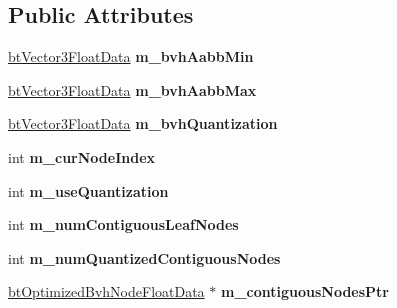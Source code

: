 \subsection*{Public Attributes}
\begin{DoxyCompactItemize}
\item 
\mbox{\label{structbtQuantizedBvhFloatData_a32a0799ac502d8ce7752ff3df7c22e9e}} 
\hyperlink{structbtVector3FloatData}{bt\+Vector3\+Float\+Data} {\bfseries m\+\_\+bvh\+Aabb\+Min}
\item 
\mbox{\label{structbtQuantizedBvhFloatData_add30eea3c705a49af6590f15fa0881d8}} 
\hyperlink{structbtVector3FloatData}{bt\+Vector3\+Float\+Data} {\bfseries m\+\_\+bvh\+Aabb\+Max}
\item 
\mbox{\label{structbtQuantizedBvhFloatData_aaab5b74a8072e63156dccf909e44fdad}} 
\hyperlink{structbtVector3FloatData}{bt\+Vector3\+Float\+Data} {\bfseries m\+\_\+bvh\+Quantization}
\item 
\mbox{\label{structbtQuantizedBvhFloatData_a1bfc127a4ca593443aed5b2fdbfc1db9}} 
int {\bfseries m\+\_\+cur\+Node\+Index}
\item 
\mbox{\label{structbtQuantizedBvhFloatData_a7b81e5922d4f587a4c4747339111d301}} 
int {\bfseries m\+\_\+use\+Quantization}
\item 
\mbox{\label{structbtQuantizedBvhFloatData_a9a3ba292837f9240e488b48edfa7c581}} 
int {\bfseries m\+\_\+num\+Contiguous\+Leaf\+Nodes}
\item 
\mbox{\label{structbtQuantizedBvhFloatData_a46438c60a07ca07c08aa5a5603cab306}} 
int {\bfseries m\+\_\+num\+Quantized\+Contiguous\+Nodes}
\item 
\mbox{\label{structbtQuantizedBvhFloatData_a2e9d35f2d7bd8d16dd2414ed0ed6f4e6}} 
\hyperlink{structbtOptimizedBvhNodeFloatData}{bt\+Optimized\+Bvh\+Node\+Float\+Data} $\ast$ {\bfseries m\+\_\+contiguous\+Nodes\+Ptr}
\item 
\mbox{\label{structbtQuantizedBvhFloatData_aa70d44e589b3c6c29c2507665c98f4ab}} 

\end{DoxyCompactItemize}
